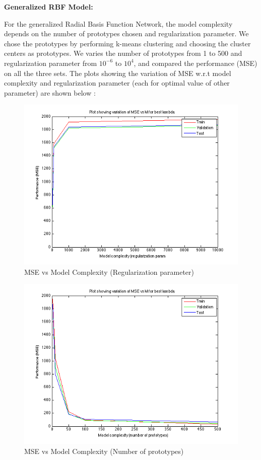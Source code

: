 \documentclass{article}
\begin{document}
\textbf{Generalized RBF Model:}

For the generalized Radial Basis Function Network, the model complexity depends on the number of prototypes chosen and regularization parameter. We chose the prototypes by performing k-means clustering and choosing the cluster centers as prototypes. We varies the number of prototypes from 1 to 500 and regularization parameter from $10^{-6}$ to $10^4$, and compared the performance (MSE) on all the three sets. The plots showing the variation of MSE w.r.t model complexity and regularization parameter (each for optimal value of other parameter) are shown below :

\begin{figure}[H]
\centering
\includegraphics[width=0.8\linewidth]{Regression/rbfnn_bivariate/mse_lambda.png}
\caption{MSE vs Model Complexity (Regularization parameter)}
\end{figure}

\begin{figure}[H]
\centering
\includegraphics[width=0.8\linewidth]{Regression/rbfnn_bivariate/mse_m.png}
\caption{MSE vs Model Complexity (Number of prototypes)}
\end{figure}
\end{document}
